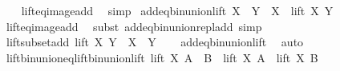 \begin{isabellebody}
%
\isadelimproof
\ \ %
\endisadelimproof
%
\isatagproof
{}\isamarkupfalse%
\ lift{\isacharunderscore}{\kern0pt}eq{\isacharunderscore}{\kern0pt}image{\isacharunderscore}{\kern0pt}add\ \isamarkupfalse%
\ simp%
\endisatagproof
{\isafoldproof}%
%
\isadelimproof
\isanewline
%
\endisadelimproof
\isanewline
{}\isamarkupfalse%
\ add{\isacharunderscore}{\kern0pt}eq{\isacharunderscore}{\kern0pt}bin{\isacharunderscore}{\kern0pt}union{\isacharunderscore}{\kern0pt}lift{\isacharcolon}{\kern0pt}\ {\isachardoublequoteopen}X\ {\isacharplus}{\kern0pt}\ Y\ {\isacharequal}{\kern0pt}\ X\ {\isasymunion}\ lift\ X\ Y{\isachardoublequoteclose}\isanewline
%
\isadelimproof
\ \ %
\endisadelimproof
%
\isatagproof
{}\isamarkupfalse%
\ lift{\isacharunderscore}{\kern0pt}eq{\isacharunderscore}{\kern0pt}image{\isacharunderscore}{\kern0pt}add\ \isamarkupfalse%
\ {\isacharparenleft}{\kern0pt}subst\ add{\isacharunderscore}{\kern0pt}eq{\isacharunderscore}{\kern0pt}bin{\isacharunderscore}{\kern0pt}union{\isacharunderscore}{\kern0pt}repl{\isacharunderscore}{\kern0pt}add{\isacharparenright}{\kern0pt}\ simp%
\endisatagproof
{\isafoldproof}%
%
\isadelimproof
\isanewline
%
\endisadelimproof
\isanewline
{}\isamarkupfalse%
\ lift{\isacharunderscore}{\kern0pt}subset{\isacharunderscore}{\kern0pt}add{\isacharcolon}{\kern0pt}\ {\isachardoublequoteopen}lift\ X\ Y\ {\isasymsubseteq}\ X\ {\isacharplus}{\kern0pt}\ Y{\isachardoublequoteclose}\isanewline
%
\isadelimproof
\ \ %
\endisadelimproof
%
\isatagproof
{}\isamarkupfalse%
\ add{\isacharunderscore}{\kern0pt}eq{\isacharunderscore}{\kern0pt}bin{\isacharunderscore}{\kern0pt}union{\isacharunderscore}{\kern0pt}lift\ \isamarkupfalse%
\ auto%
\endisatagproof
{\isafoldproof}%
%
\isadelimproof
%
\endisadelimproof
%
\isadelimdocument
%
\endisadelimdocument
%
\isatagdocument
%
\isamarkuptrue%
%
\endisatagdocument
{\isafolddocument}%
%
\isadelimdocument
%
\endisadelimdocument
{}\isamarkupfalse%
\ lift{\isacharunderscore}{\kern0pt}bin{\isacharunderscore}{\kern0pt}union{\isacharunderscore}{\kern0pt}eq{\isacharunderscore}{\kern0pt}lift{\isacharunderscore}{\kern0pt}bin{\isacharunderscore}{\kern0pt}union{\isacharunderscore}{\kern0pt}lift{\isacharcolon}{\kern0pt}\ {\isachardoublequoteopen}lift\ X\ {\isacharparenleft}{\kern0pt}A\ {\isasymunion}\ B{\isacharparenright}{\kern0pt}\ {\isacharequal}{\kern0pt}\ lift\ X\ A\ {\isasymunion}\ lift\ X\ B{\isachardoublequoteclose}\isanewline

\end{isabellebody}
